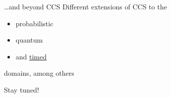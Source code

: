 \documentclass{beamer}
\begin{document}
\begin{frame}{\dots and beyond CCS}
        Different extensions of CCS to the 
        \begin{itemize}
                \item probabilistic
                \item quantum
                \item and \alert{\underline{timed}}
        \end{itemize}
        domains, among others
        

        \vfill
        Stay tuned!
\end{frame}
\nocite{milner80}


\end{document}

